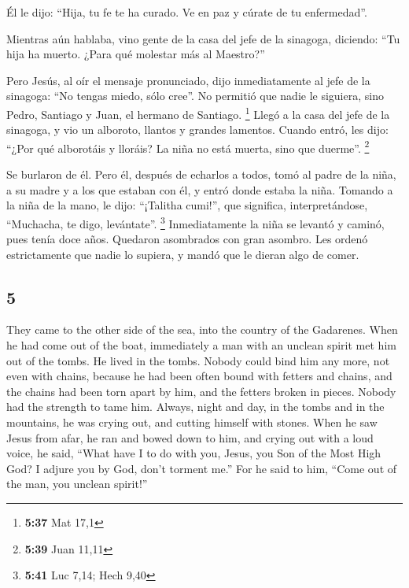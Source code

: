 \begin{paracol}{2}
 Él le dijo: ``Hija, tu fe te ha curado. Ve en paz y
cúrate de tu enfermedad''.

 Mientras aún hablaba, vino gente de la casa del jefe de
la sinagoga, diciendo: ``Tu hija ha muerto. ¿Para qué molestar más al
Maestro?''

 Pero Jesús, al oír el mensaje pronunciado, dijo
inmediatamente al jefe de la sinagoga: ``No tengas miedo, sólo cree''.
 No permitió que nadie le siguiera, sino Pedro, Santiago
y Juan, el hermano de Santiago. \footnote{\textbf{5:37} Mat 17,1}
 Llegó a la casa del jefe de la sinagoga, y vio un
alboroto, llantos y grandes lamentos.  Cuando entró, les
dijo: ``¿Por qué alborotáis y lloráis? La niña no está muerta, sino que
duerme''. \footnote{\textbf{5:39} Juan 11,11}

 Se burlaron de él. Pero él, después de echarlos a todos,
tomó al padre de la niña, a su madre y a los que estaban con él, y entró
donde estaba la niña.  Tomando a la niña de la mano, le
dijo: ``¡Talitha cumi!'', que significa, interpretándose, ``Muchacha, te
digo, levántate''. \footnote{\textbf{5:41} Luc 7,14; Hech 9,40}
 Inmediatamente la niña se levantó y caminó, pues tenía
doce años. Quedaron asombrados con gran asombro.  Les
ordenó estrictamente que nadie lo supiera, y mandó que le dieran algo de
comer.

\switchcolumn
\begin{otherlanguage}{english}

\hypertarget{section-9}{%
\section{5}\label{section-9}}

 They came to the other side of the sea, into the country
of the Gadarenes.  When he had come out of the boat,
immediately a man with an unclean spirit met him out of the tombs.
 He lived in the tombs. Nobody could bind him any more,
not even with chains,  because he had been often bound
with fetters and chains, and the chains had been torn apart by him, and
the fetters broken in pieces. Nobody had the strength to tame him.
 Always, night and day, in the tombs and in the mountains,
he was crying out, and cutting himself with stones.  When
he saw Jesus from afar, he ran and bowed down to him,  and
crying out with a loud voice, he said, ``What have I to do with you,
Jesus, you Son of the Most High God? I adjure you by God, don't torment
me.''  For he said to him, ``Come out of the man, you
unclean spirit!''


\end{otherlanguage}
\end{paracol}
